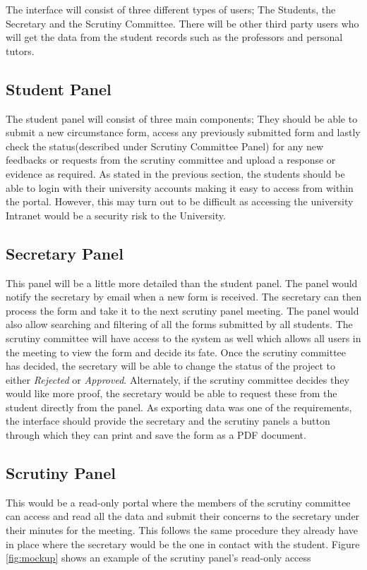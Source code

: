 \documentclass[../main.tex]{subfiles}
\begin{document}
\raggedright
The interface will consist of three different types of users; The Students, the Secretary and the Scrutiny Committee. There will be other third party users who will get the data from the student records such as the professors and personal tutors. 

\subsection{Student Panel}
The student panel will consist of three main components; They should be able to submit a new circumstance form, access any previously submitted form and lastly check the status(described under Scrutiny Committee Panel) for any new feedbacks or requests from the scrutiny committee and upload a response or evidence as required. As stated in the previous section, the students should be able to login with their university accounts making it easy to access from within the portal. However, this may turn out to be difficult as accessing the university Intranet would be a security risk to the University.

\subsection{Secretary Panel}
This panel will be a little more detailed than the student panel. The panel would notify the secretary by email when a new form is received. The secretary can then process the form and take it to the next scrutiny panel meeting. The panel would also allow searching and filtering of all the forms submitted by all students. The scrutiny committee will have access to the system as well which allows all users in the meeting to view the form and decide its fate. Once the scrutiny committee has decided, the secretary will be able to change the status of the project to either \textit{Rejected} or \textit{Approved}. Alternately, if the scrutiny committee decides they would like more proof, the secretary would be able to request these from the student directly from the panel. As exporting data was one of the requirements, the interface should provide the secretary and the scrutiny panels a button through which they can print and save the form as a PDF document. 

\subsection{Scrutiny Panel}
This would be a read-only portal where the members of the scrutiny committee can access and read all the data and submit their concerns to the secretary under their minutes for the meeting. This follows the same procedure they already have in place where the secretary would be the one in contact with the student. Figure \ref{fig:mockup} shows an example of the scrutiny panel's read-only access
\end{document}
